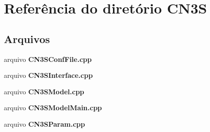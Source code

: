 \section{Referência do diretório C\+N3S}
\label{dir_62b15052bdb06a26ce9cc146392e68fc}
\subsection*{Arquivos}
\begin{DoxyCompactItemize}
\item 
arquivo {\bf C\+N3\+S\+Conf\+File.\+cpp}
\item 
arquivo {\bf C\+N3\+S\+Interface.\+cpp}
\item 
arquivo {\bf C\+N3\+S\+Model.\+cpp}
\item 
arquivo {\bf C\+N3\+S\+Model\+Main.\+cpp}
\item 
arquivo {\bf C\+N3\+S\+Param.\+cpp}
\end{DoxyCompactItemize}

